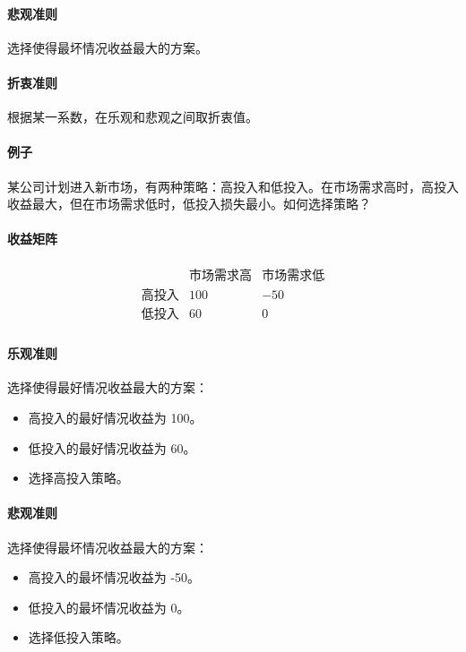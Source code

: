 \documentclass[UTF8]{ctexart}
\begin{document}
\paragraph{悲观准则}
选择使得最坏情况收益最大的方案。

\paragraph{折衷准则}
根据某一系数，在乐观和悲观之间取折衷值。

\paragraph{例子}
某公司计划进入新市场，有两种策略：高投入和低投入。在市场需求高时，高投入收益最大，但在市场需求低时，低投入损失最小。如何选择策略？

\paragraph{收益矩阵}
\[
\begin{array}{ccc}
 & \text{市场需求高} & \text{市场需求低} \\
 \text{高投入} & 100 & -50 \\
 \text{低投入} & 60 & 0 \\
\end{array}
\]

\paragraph{乐观准则}
选择使得最好情况收益最大的方案：
\begin{itemize}
    \item 高投入的最好情况收益为 100。
    \item 低投入的最好情况收益为 60。
    \item 选择高投入策略。
\end{itemize}

\paragraph{悲观准则}
选择使得最坏情况收益最大的方案：
\begin{itemize}
    \item 高投入的最坏情况收益为 -50。
    \item 低投入的最坏情况收益为 0。
    \item 选择低投入策略。
\end{itemize}
\end{document}

